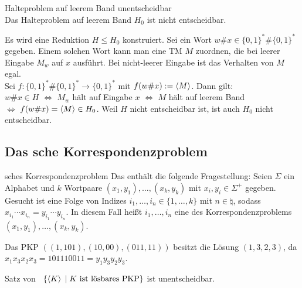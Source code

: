 \begin{Satz}{Halteproblem auf leerem Band unentscheidbar}\\
    Das Halteproblem auf leerem Band $H_0$ ist nicht entscheidbar.
\end{Satz}

\begin{Beweis}
    Es wird eine Reduktion $H \le H_0$ konstruiert.
    Sei ein Wort $w\# x \in \{0, 1\}^\ast \# \{0, 1\}^\ast$ gegeben.
    Einem solchen Wort kann man eine TM $M$ zuordnen,
    die bei leerer Eingabe $M_w$ auf $x$ ausführt.
    Bei nicht-leerer Eingabe ist das Verhalten von $M$ egal.\\
    Sei $f\colon \{0, 1\}^\ast \# \{0, 1\}^\ast \rightarrow \{0, 1\}^\ast$ mit
    $f(w\# x) := \left\langle M\right\rangle$.
    Dann gilt:\\
    $w\# x \in H$ $\iff$
    $M_w$ hält auf Eingabe $x$ $\iff$
    $M$ hält auf leerem Band\\
    $\iff$
    $f(w\# x) = \left\langle M\right\rangle \in H_0$.
    Weil $H$ nicht entscheidbar ist, ist auch $H_0$ nicht entscheidbar.
\end{Beweis}

\pagebreak

\subsection{%
    Das sche Korrespondenzproblem%
}

\begin{Def}{sches Korrespondenzproblem}
    Das  enthält die folgende Fragestellung:
    Seien $\Sigma$ ein Alphabet und $k$ Wortpaare $(x_1, y_1), \dotsc, (x_k, y_k)$ mit
    $x_i, y_i \in \Sigma^+$ gegeben.
    Gesucht ist eine Folge von Indizes $i_1, \dotsc, i_n \in \{1, \dotsc, k\}$ mit
    $n \in \natural$, sodass  $x_{i_1} \dotsb x_{i_n} = y_{i_1} \dotsb y_{i_n}$.
    In diesem Fall heißt $i_1, \dotsc, i_n$ eine  des Korrespondenzproblems
    $(x_1, y_1), \dotsc, (x_k, y_k)$.
\end{Def}

\begin{Bsp}
    Das PKP $((1, 101), (10, 00), (011, 11))$ besitzt die Lösung
    $(1, 3, 2, 3)$, da $x_1 x_3 x_2 x_3 = 101110011 = y_1 y_3 y_2 y_3$.
\end{Bsp}

\begin{Satz}{Satz von \upshape\,\!}
    $\{\left\langle K\right\rangle \;|\; K \text{ ist lösbares PKP}\}$ ist unentscheidbar.
\end{Satz}

